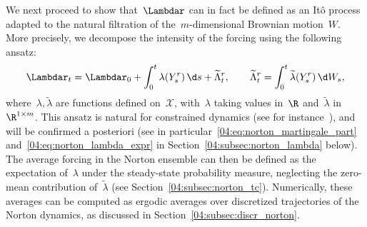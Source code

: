 We next proceed to show that~$\Lambdar$ can in fact be defined as an Itô process adapted to the natural filtration of the~$m$-dimensional Brownian motion~$W$. More precisely, we decompose the intensity of the forcing using the following ansatz:
\begin{equation}
    \label{04:eq:norton_lambda_sde}
    \Lambdar_t = \Lambdar_0 + \int_0^t \lambda(Y^r_s)\, \d s + \widetilde{\Lambda}_t^r,\qquad  \widetilde{\Lambda}_t^r = \int_0^t \widetilde{\lambda}(Y^r_s)\,\d W_s,
\end{equation}
where~$\lambda,\widetilde{\lambda}$ are functions defined on~$\mathcal X$, with~$\lambda$ taking values in~$\R$ and~$\widetilde \lambda$ in~$\R^{1\times m}$. This ansatz is natural for constrained dynamics (see for instance~\cite[Chapter 3]{LRS10}), and will be confirmed a posteriori (see in particular~\eqref{04:eq:norton_martingale_part} and~\eqref{04:eq:norton_lambda_expr} in Section~\ref{04:subsec:norton_lambda} below). The average forcing in the Norton ensemble can then be defined as the expectation of~$\lambda$ under the steady-state probability measure, neglecting the zero-mean contribution of~$\widetilde{\lambda}$ (see Section~\ref{04:subsec:norton_tc}).
Numerically, these averages can be computed as ergodic averages over discretized trajectories of the Norton dynamics, as discussed in Section~\ref{04:subsec:discr_norton}.

